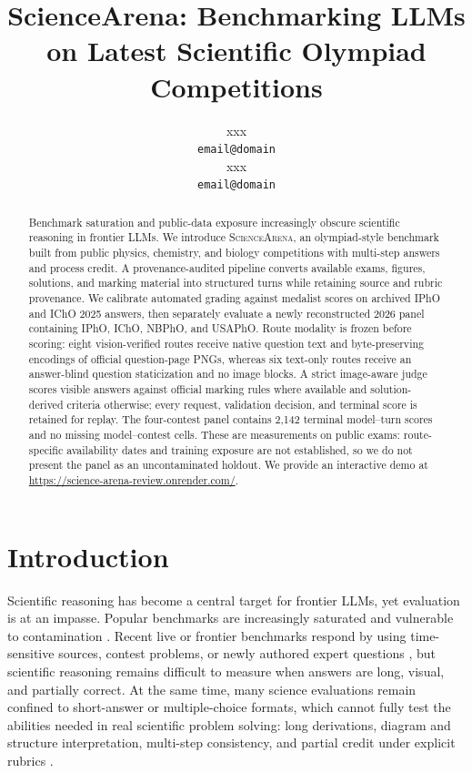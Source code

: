 \documentclass[11pt]{article}
\title{ScienceArena: Benchmarking LLMs on Latest Scientific Olympiad Competitions}
\author{xxx \\
  \texttt{email@domain} \\\And
  xxx \\
  \texttt{email@domain} \\}
\begin{document}
\maketitle
\begin{abstract}
Benchmark saturation and public-data exposure increasingly obscure scientific reasoning in frontier LLMs. We introduce \textsc{ScienceArena}, an olympiad-style benchmark built from public physics, chemistry, and biology competitions with multi-step answers and process credit. A provenance-audited pipeline converts available exams, figures, solutions, and marking material into structured turns while retaining source and rubric provenance. We calibrate automated grading against medalist scores on archived IPhO and IChO 2025 answers, then separately evaluate a newly reconstructed 2026 panel containing IPhO, IChO, NBPhO, and USAPhO. Route modality is frozen before scoring: eight vision-verified routes receive native question text and byte-preserving encodings of official question-page PNGs, whereas six text-only routes receive an answer-blind question staticization and no image blocks. A strict image-aware judge scores visible answers against official marking rules where available and solution-derived criteria otherwise; every request, validation decision, and terminal score is retained for replay. The four-contest panel contains 2,142 terminal model--turn scores and no missing model--contest cells. These are measurements on public exams: route-specific availability dates and training exposure are not established, so we do not present the panel as an uncontaminated holdout. We provide an interactive demo at \url{https://science-arena-review.onrender.com/}.
\end{abstract}


\section{Introduction}
Scientific reasoning has become a central target for frontier LLMs, yet evaluation is at an impasse.
Popular benchmarks are increasingly saturated and vulnerable to contamination \citep{hendrycks2021mmlu,li2023contamination,rein2023gpqa,white2024livebench,phan2025hle}.
Recent live or frontier benchmarks respond by using time-sensitive sources, contest problems, or newly authored expert questions \citep{jain2024livecodebench,glazer2024frontiermath,balunovic2025matharena}, but scientific reasoning remains difficult to measure when answers are long, visual, and partially correct.
At the same time, many science evaluations remain confined to short-answer or multiple-choice formats, which cannot fully test the abilities needed in real scientific problem solving: long derivations, diagram and structure interpretation, multi-step consistency, and partial credit under explicit rubrics \citep{wang2023scibench,lu2023mathvista,yue2023mmmu,he2024olympiadbench,lu2022scienceqa,laurent2024labbench,mirza2025chembench}.
\end{document}
